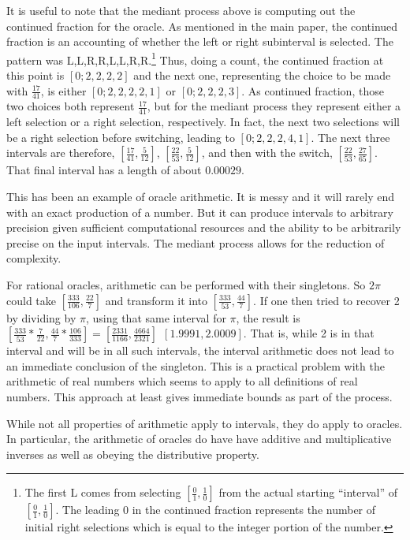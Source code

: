 \documentclass[12pt]{article}
\theoremstyle{remark}
\begin{document}
It is useful to note that the mediant process above is computing out the continued fraction for the oracle. As mentioned in the main paper, the continued fraction is an accounting of whether the left or right subinterval is selected. The pattern was L,L,R,R,L,L,R,R.\footnote{The first L comes from selecting $[\frac{0}{1}, \frac{1}{0}]$ from the actual starting ``interval'' of $[\frac{0}{1}, \frac{1}{0}]$. The leading 0 in the continued fraction represents the number of initial right selections which is equal to the integer portion of the number.} Thus, doing a count, the continued fraction at this point is $[0;2,2,2,2]$ and the next one, representing the choice to be made with $\frac{17}{41}$, is either $[0;2,2,2,2,1]$ or $[0;2,2,2,3]$. As continued fraction, those two choices both represent $\frac{17}{41}$, but for the mediant process they represent either a left selection or a right selection, respectively. In fact, the next two selections will be a right selection before switching, leading to $[0;2,2,2,4,1]$. The next three intervals are therefore, $[\frac{17}{41}, \frac{5}{12}]$, $[\frac{22}{53}, \frac{5}{12}]$, and then with the switch, $[\frac{22}{53}, \frac{27}{65}]$. That final interval has a length of about $0.00029$. 

This has been an example of oracle arithmetic. It is messy and it will rarely end with an exact production of a number. But it can produce intervals to arbitrary precision given sufficient computational resources and the ability to be arbitrarily precise on the input intervals. The mediant process allows for the reduction of complexity. 

For rational oracles, arithmetic can be performed with their singletons. So $2 \pi$ could take $[\frac{333}{106}, \frac{22}{7}]$ and transform it into $[\frac{333}{53}, \frac{44}{7}]$. If one then tried to recover 2 by dividing  by $\pi$, using that same interval for $\pi$, the result is $[\frac{333}{53} * \frac{7}{22}, \frac{44}{7} * \frac{106}{333}] = [\frac{2331}{1166}, \frac{4664}{2321}] ~~ [1.9991, 2.0009]$. That is, while 2 is in that interval and will be in all such intervals, the interval arithmetic does not lead to an immediate conclusion of the singleton. This is a practical problem with the arithmetic of real numbers which seems to apply to all definitions of real numbers. This approach at least gives immediate bounds as part of the process.

While not all properties of arithmetic apply to intervals, they do apply to oracles. In particular, the arithmetic of oracles do have have additive and multiplicative inverses as well as obeying the distributive property.
\end{document}
